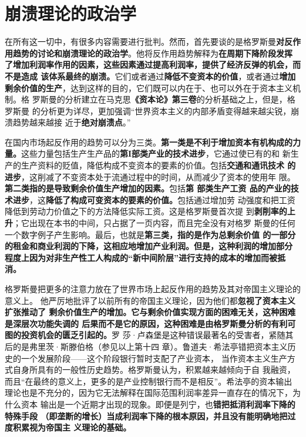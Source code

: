 \section{崩溃理论的政治学}

在所有这一切中，有很多内容需要进行批判。然而，首先要谈的是格罗斯曼\textbf{对反作
用趋势的讨论和崩溃理论的政治学}。他将反作用趋势解释为\textbf{在周期下降阶段发挥
了增加利润率作用的因素，这些因素通过提高利润率，提供了经济反弹的机会，而不是造成
该体系最终的崩溃。}它们或者通过\textbf{降低不变资本的价值}，或者通过\textbf{增加
剩余价值的生产}，达到这样的目的，它们既可以内在于、也可以外在于资本主义机制。格
罗斯曼的分析建立在马克思\textbf{《资本论》第三卷}的分析基础之上，但是，格罗斯曼
的分析更为详尽，更加强调“世界资本主义的内部矛盾变得越来越尖锐，崩溃趋势越来越接
近于\textbf{绝对崩溃点}。”

在国内市场起反作用的趋势可以分为三类。\textbf{第一类是不利于增加资本有机构成的力
  量。}这些力量包括生产生产品的\textbf{第Ι部类产业的技术进步}，它通过使已有的和
新生产的生产资料的贬值，降低构成不变资本的要素的价值。包括\textbf{交通和通讯技术
  的进步}，这削减了不变资本处于流通过程中的时间，从而减少了资本的使用年
限。\textbf{第二类指的是导致剩余价值生产增加的因素。}包括\textbf{第 部类生产工资
  品的产业的技术进步}，这\textbf{降低了构成可变资本的要素的价值。}包括通过增加劳
动强度和把工资降低到劳动力价值之下的方法降低实际工资。这是格罗斯曼首次提
到\textbf{剥削率的上升}；它出现在本书的中间，只占据了一页内容，而且完全没有对格罗
斯曼的任何一个数字例子产生影响。最后，也就是\textbf{第三类，指的是作为总剩余价值
  的一部分的租金和商业利润的下降，这相应地增加产业利润。但是，这种利润的增加部分
  程度上因为对非生产性工人构成的“新中间阶层”进行支持的成本的增加而被抵消。}

格罗斯曼把更多的注意力放在了世界市场上起反作用的趋势及其对帝国主义理论的意义上。
他严厉地批评了以前所有的帝国主义理论，因为他们都\textbf{忽视了资本主义扩张推动了
  剩余价值生产的增加。它与剩余价值实现方面的困难无关，这种困难是深层次功能失调的
  后果而不是它的原因，这种困难是由格罗斯曼分析的有利可图的投资机会的匮乏引起的。}罗
莎·卢森堡是这种错误最著名的受害者，紧随其后的是弗里茨·斯滕伯格（参见以上第十四
章）。鲁道夫·希法亭错把资本主义历史的一个发展阶段——这个阶段银行暂时支配了产业资本，
当作资本主义生产方式自身所具有的一般性历史趋势。格罗斯曼认为，积累越来越倾向于自
我融资，而且“在最终的意义上，更多的是产业控制银行而不是相反”。希法亭的资本输出
理论也是不充分的，因为它无法解释在国际范围利润率差异一直存在的情况下，为什么资本
输出是一个近期才出现的现象。即便是列宁，也\textbf{错把抵消利润率下降的特殊手段
  （即垄断的增长）当成利润率下降的根本原因，并且没有能明确地把过度积累视为帝国主
  义理论的基础。}

